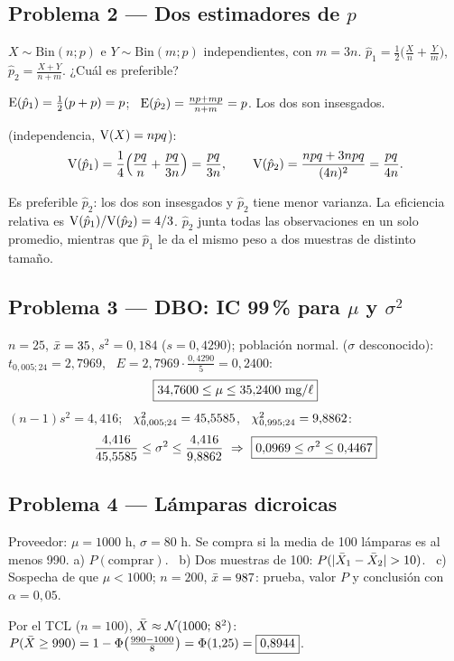 \subsection{Problema 2 --- Dos estimadores de $p$}
\begin{enun}
$X\sim\mathrm{Bin}(n;p)$ e $Y\sim\mathrm{Bin}(m;p)$ independientes, con $m=3n$. $\hat p_1=\frac12\big(\frac Xn+\frac Ym\big)$, \ $\hat p_2=\frac{X+Y}{n+m}$. ¿Cuál es preferible?
\end{enun}
 $\mathrm{E}(\hat p_1)=\frac12(p+p)=p$; \ $\mathrm{E}(\hat p_2)=\frac{np+mp}{n+m}=p$. Los dos son insesgados.

 (independencia, $\mathrm{V}(X)=npq$):
\[
\mathrm{V}(\hat p_1)=\frac14\Big(\frac{pq}{n}+\frac{pq}{3n}\Big)=\frac{pq}{3n},\qquad
\mathrm{V}(\hat p_2)=\frac{npq+3npq}{(4n)^2}=\frac{pq}{4n}.
\]
\begin{resp}
Es preferible $\hat p_2$: los dos son insesgados y $\hat p_2$ tiene menor varianza. La eficiencia relativa es $\mathrm{V}(\hat p_1)/\mathrm{V}(\hat p_2)=4/3$. $\hat p_2$ junta todas las observaciones en un solo promedio, mientras que $\hat p_1$ le da el mismo peso a dos muestras de distinto tamaño.
\end{resp}

\subsection{Problema 3 --- DBO: IC 99\,\% para $\mu$ y $\sigma^2$}
$n=25$, $\bar{x}=35$, $s^2=0{,}184$ ($s=0{,}4290$); población normal.
 ($\sigma$ desconocido): $t_{0,005;24}=2{,}7969$, \ $E=2{,}7969\cdot\frac{0{,}4290}{5}=0{,}2400$:
\[
\res{34{,}7600\le\mu\le35{,}2400\ \text{mg}/\ell}
\]
 $(n-1)s^2=4{,}416$; \ $\chi^2_{0,005;24}=45{,}5585$, \ $\chi^2_{0,995;24}=9{,}8862$:
\[
\frac{4{,}416}{45{,}5585}\le\sigma^2\le\frac{4{,}416}{9{,}8862}\ \Rightarrow\ \res{0{,}0969\le\sigma^2\le0{,}4467}
\]

\subsection{Problema 4 --- Lámparas dicroicas}
\begin{enun}
Proveedor: $\mu=1000$ h, $\sigma=80$ h. Se compra si la media de 100 lámparas es al menos 990.
a) $P(\text{comprar})$. \ b) Dos muestras de 100: $P(|\Xb_1-\Xb_2|>10)$. \ c) Sospecha de que $\mu<1000$; $n=200$, $\bar{x}=987$: prueba, valor $P$ y conclusión con $\alpha=0{,}05$.
\end{enun}
 Por el TCL ($n=100$), $\bar{X}\approx\mathcal{N}(1000;\,8^2)$:
$P(\bar{X}\ge990)=1-\Phi\big(\frac{990-1000}{8}\big)=\Phi(1{,}25)=\boxed{0{,}8944}$.

